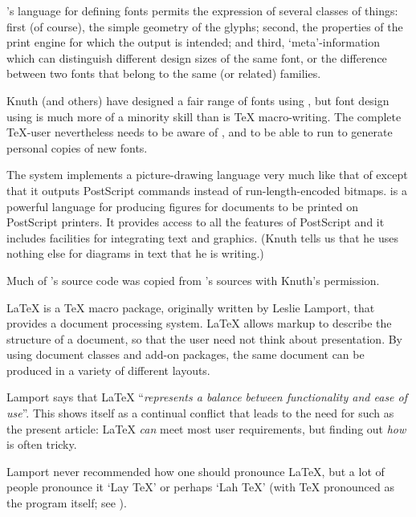 \MF{}'s language for defining fonts permits the expression of several
classes of things: first (of course), the simple geometry of the
glyphs; second, the properties of the print engine for which the
output is intended; and third, `meta'-information which can
distinguish different design sizes of the same font, or the difference
between two fonts that belong to the same (or related) families.

Knuth (and others) have designed a fair range of fonts using \MF{},
but font design using \MF{} is much more of a minority skill than is
\TeX{} macro-writing.  The complete \TeX{}-user nevertheless needs to
be aware of \MF{}, and to be able to run \MF{} to generate personal
copies of new fonts.


The \MP{} system implements a picture-drawing language very much like
that of \MF{} except that it outputs PostScript commands instead of
run-length-encoded bitmaps.  \MP{} is a powerful language for
producing figures for documents to be printed on PostScript printers.
It provides access to all the features of PostScript and it includes
facilities for integrating text and graphics.  (Knuth tells us that he
uses nothing else for diagrams in text that he is writing.)

Much of \MP{}'s source code was copied from \MF{}'s sources with
Knuth's permission.


\LaTeX{} is a \TeX{} macro package, originally written by Leslie Lamport, that
provides a document processing system.  \LaTeX{} allows markup to
describe the structure of a document, so that the user
need not think about presentation. By using document classes and
add-on packages, the same document can be produced in a variety of
different layouts.

Lamport says that \LaTeX{}
``\emph{represents a balance between functionality and ease of use}''.
This shows itself as a continual conflict that leads to
the need for such as the present article: \LaTeX{} \emph{can} 
meet most user requirements, but finding out \emph{how} is often
tricky.

\htmlignore
\begingroup\boldmath
\endhtmlignore
{}
\htmlignore
\endgroup\par
\endhtmlignore

Lamport never recommended how one should pronounce \LaTeX{}, but a lot
of people pronounce it `Lay \TeX{}' or perhaps `Lah \TeX{}' (with
\TeX{} pronounced as the program itself; see
).

